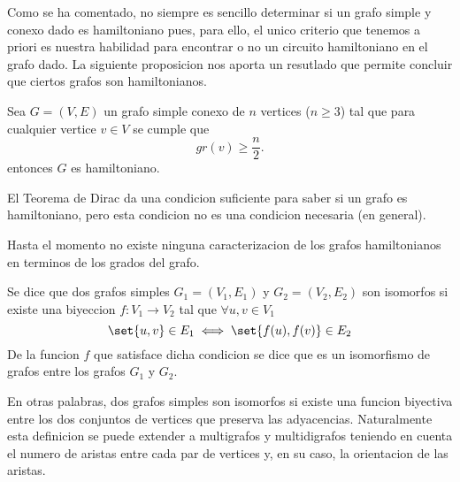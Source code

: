 Como se ha comentado, no siempre es sencillo determinar si un grafo simple y conexo dado es hamiltoniano pues, para ello, el unico criterio que tenemos a priori es nuestra habilidad para encontrar o no un circuito hamiltoniano en el grafo dado. La siguiente proposicion nos aporta un resutlado que permite concluir que ciertos grafos son hamiltonianos.

\begin{theorem}[de Dirac]
	Sea \(G = (V,E )\) un grafo simple conexo de \(n \) vertices (\(n \geq 3 \)) tal que para cualquier vertice \(v \in V \) se cumple que
	\[
		gr(v) \geq \frac{n }{2 }.
	\]
	entonces \(G \) es hamiltoniano.
\end{theorem}

El Teorema de Dirac da una condicion suficiente para saber si un grafo es hamiltoniano, pero esta condicion no es una condicion necesaria (en general).

Hasta el momento no existe ninguna caracterizacion de los grafos hamiltonianos en terminos de los grados del grafo.

\begin{definition}
	Se dice que dos grafos simples \(G_1 = (V_1,E_1 )\) y \(G_2 = (V_2,E_2 )\) son isomorfos si existe una biyeccion \(f \colon V_1 \to V_2 \) tal que \(\forall u,v \in V_1 \)
	\[
		\set{u,v} \in E_1 \iff \set{f(u),f(v)} \in E_2
	\]
	De la funcion \(f \) que satisface dicha condicion se dice que es un isomorfismo de grafos entre los grafos \(G_1 \) y \(G_2 \).
\end{definition}
En otras palabras, dos grafos simples son isomorfos si existe una funcion biyectiva entre los dos conjuntos de vertices que preserva las adyacencias. Naturalmente esta definicion se puede extender a multigrafos y multidigrafos teniendo en cuenta el numero de aristas entre cada par de vertices y, en su caso, la orientacion de las aristas.

